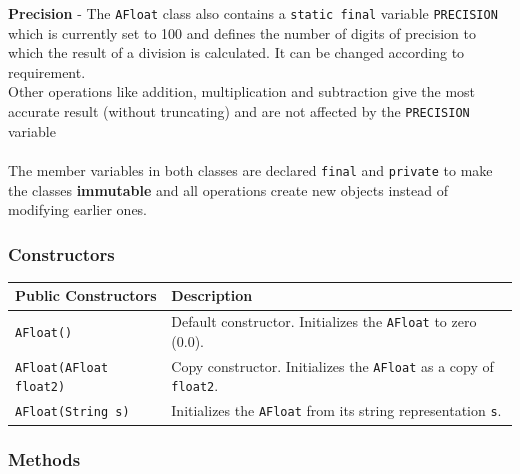 \documentclass[a4paper,12pt]{article}
\begin{document}
\textbf{Precision} - The \texttt{AFloat} class also contains a \texttt{static final} variable \texttt{PRECISION} which is currently set to 100 and defines the number of digits of precision to which the result of a division is calculated. It can be changed according to requirement.\\
Other operations like addition, multiplication and subtraction give the most accurate result (without truncating) and are not affected by the \texttt{PRECISION} variable\\\\

The member variables in both classes are declared \texttt{final} and \texttt{private} to make the classes \textbf{immutable} and all operations create new objects instead of modifying earlier ones.

\subsubsection{Constructors}

\begin{center}
\begin{tabular}{|l|p{8cm}|}
\hline
\textbf{Public Constructors} & \textbf{Description} \\
\hline
\texttt{AFloat()} & Default constructor. Initializes the \texttt{AFloat} to zero (0.0). \\
\hline
\texttt{AFloat(AFloat float2)} & Copy constructor. Initializes the \texttt{AFloat} as a copy of \texttt{float2}. \\
\hline
\texttt{AFloat(String s)} & Initializes the \texttt{AFloat} from its string representation \texttt{s}. \\
\hline
\end{tabular}
\end{center}

\subsubsection{Methods}
\end{document}
